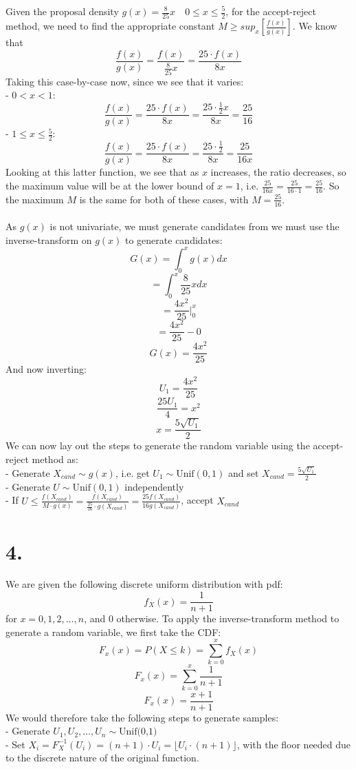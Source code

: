 \documentclass{article}
\begin{document}
{Given the proposal density \(g(x) = \frac{8}{25}x \quad 0 \leq x \leq \frac{5}{2}\), for the accept-reject method, we need to find the appropriate constant \( M \geq sup_x[\frac{f(x)}{g(x)}]\). We know that 
\[
  \frac{f(x)}{g(x)} = \frac{f(x)}{\frac{8}{25}x} = \frac{25 \cdot f(x)}{8x}
\]
Taking this case-by-case now, since we see that it varies: \\
- \(0 < x < 1\): \\
\[
  \frac{f(x)}{g(x)} = \frac{25 \cdot f(x)}{8x} = \frac{25 \cdot \frac{1}{2}x}{8x} = \frac{25}{16}
\]
- \(1 \leq x \leq \frac{5}{2}\): \\
\[
  \frac{f(x)}{g(x)} = \frac{25 \cdot f(x)}{8x} = \frac{25 \cdot \frac{1}{2}}{8x} = \frac{25}{16x}
\]
Looking at this latter function, we see that as \(x\) increases, the ratio decreases, so the maximum value will be at the lower bound of \(x = 1\), i.e. \(\frac{25}{16x} = \frac{25}{16 \cdot 1} = \frac{25}{16}\). So the maximum \(M\) is the same for both of these cases, with \(M = \frac{25}{16}\). \\ \\
As \(g(x)\) is not univariate, we must generate candidates from we must use the inverse-transform on \(g(x)\) to generate candidates:
\[
  G(x) = \int_0^x g(x) dx
\]
\[
  = \int_0^x \frac{8}{25}x dx
\]
\[
  = \frac{4x^2}{25} |_0^x 
\]
\[
  = \frac{4x^2}{25} - 0 
\]
\[
  G(x) = \frac{4x^2}{25}
\]
And now inverting:
\[
  U_1 = \frac{4x^2}{25}
\]
\[
  \frac{25U_1}{4} = x^2
\]
\[
  x = \frac{5\sqrt{U_1}}{2}
\]
We can now lay out the steps to generate the random variable using the accept-reject method as: \\
- Generate \(X_{cand} \sim g(x)\), i.e. get \(U_1 \sim \text{Unif}(0, 1)\) and set \(X_{cand} = \frac{5\sqrt{U_1}}{2}\) \\
- Generate \(U \sim \text{Unif}(0, 1)\) independently \\
- If \(U \leq \frac{f(X_{cand})}{M \cdot g(x)} = \frac{f(X_{cand})}{\frac{25}{16} \cdot g(X_{cand})} = \frac{25f(X_{cand})}{16g(X_{cand})}\), accept \(X_{cand}\)

}

{\Large 

\section*{4.}

We are given the following discrete uniform distribution with pdf:
\[
  f_X(x) = \frac{1}{n+1}
\]
for \(x = 0, 1, 2, \dots, n\), and 0 otherwise. To apply the inverse-transform method to generate a random variable, we first take the CDF:
\[
  F_x(x) = P(X \leq k) = \sum_{k=0}^{x} f_X(x)
\]
\[
  F_x(x) = \sum_{k=0}^{x} \frac{1}{n+1}
\]
\[
  F_x(x) = \frac{x + 1}{n+1}
\]
We would therefore take the following steps to generate samples: \\
- Generate \(U_1, U_2, \dots, U_n \sim \text{Unif(0,1)}\) \\ 
- Set \(X_i = F^{-1}_X (U_i) = (n+1) \cdot  U_i = \lfloor U_i \cdot (n + 1) \rfloor \), with the floor needed due to the discrete nature of the original function. 

}
\end{document}
